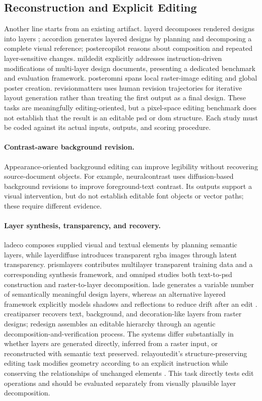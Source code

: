 \subsection{Reconstruction and Explicit Editing}
Another line starts from an existing artifact.
\ac{layerd} decomposes rendered designs into layers \citep{layerd2025}; \ac{accordion} generates layered designs by planning and decomposing a complete visual reference; \ac{postercopilot} reasons about composition and repeated layer-sensitive changes.
\ac{mildedit} explicitly addresses instruction-driven modifications of multi-layer design documents, presenting a dedicated benchmark and evaluation framework.
\ac{posteromni} spans local raster-image editing and global poster creation.
\ac{revisionmatters} uses human revision trajectories for iterative layout generation rather than treating the first output as a final design.
These tasks are meaningfully editing-oriented, but a pixel-space editing benchmark does not establish that the result is an editable \ac{psd} or \ac{dom} structure.
Each study must be coded against its actual inputs, outputs, and scoring procedure.

\paragraph{Contrast-aware background revision.}
Appearance-oriented background editing can improve legibility without recovering source-document objects.
For example, \ac{neuralcontrast} uses diffusion-based background revisions to improve foreground-text contrast.
Its outputs support a visual intervention, but do not establish editable font objects or vector paths; these require different evidence.

\paragraph{Layer synthesis, transparency, and recovery.}
\ac{ladeco} composes supplied visual and textual elements by planning semantic layers, while \ac{layerdiffuse} introduces transparent \ac{rgba} images through latent transparency.
\ac{prismlayers} contributes multilayer transparent training data and a corresponding synthesis framework, and \ac{omnipsd} studies both text-to-\ac{psd} construction and raster-to-layer decomposition.
\ac{lade} generates a variable number of semantically meaningful design layers, whereas an alternative layered framework explicitly models shadows and reflections to reduce drift after an edit \citep{layeredfx2026}.
\ac{creatiparser} recovers text, background, and decoration-like layers from raster designs; \ac{redesign} assembles an editable hierarchy through an agentic decomposition-and-verification process.
The systems differ substantially in whether layers are generated directly, inferred from a raster input, or reconstructed with semantic text preserved.
\ac{relayoutedit}'s structure-preserving editing task modifies geometry according to an explicit instruction while conserving the relationships of unchanged elements \citep{relayoutedit2026}.
This task directly tests edit operations and should be evaluated separately from visually plausible layer decomposition.

